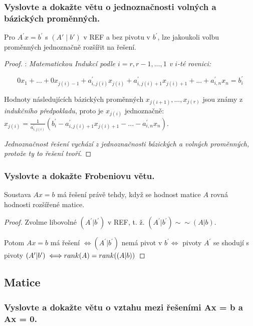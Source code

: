 \documentclass[10pt,a4paper]{article}
\begin{document}
\subsubsection{Vyslovte a dokažte větu o jednoznačnosti volných a bázických proměnných.}

Pro $A^\prime x = b^\prime$ s $(A'\mid b')$ v REF a bez pivotu v $b^\prime$, lze jakoukoli volbu proměnných jednoznačně rozšířit na řešení.


\begin{proof}:
\textit{Matematickou Indukcí podle $i = {r, r-1, ..., 1}$ v $i$-té rovnici:}

\begin{equation*}
0x_1 + ... + 0x_{j(i)-1} + a_{i, j(i)}^\prime x_{j(i)} + a_{i, j(i)+1}^\prime x_{j(i)+1} + ... + a_{i, n}^\prime x_n = b_i^\prime
\end{equation*}

Hodnoty následujících bázických proměnných $x_{j(i+1)}, ..., x_{j(r)}$ jsou známy z \textit{indukčního předpokladu}, proto je $x_{j(i)}$ jednoznačně: $x_{j(i)} = \frac{1}{a_{i, j(i)}^\prime}(b_i^\prime - a_{i, j(i)+1}^\prime x_{j(i) + 1} - ... - a_{i, n}^\prime x_n)$.

\textit{Jednoznačnost řešení vychází z jednoznačnosti bázických a volných proměnných, protože ty to řešení tvoří.}

\end{proof}


\subsubsection{Vyslovte a dokažte Frobeniovu větu.}

Soustava $Ax = b$ má řešení právě tehdy, když se hodnost matice $A$ rovná hodnosti rozšířené matice.

\begin{proof}
Zvolme libovolné $(A^\prime|b^\prime)$  v REF, t. ž. $(A^\prime|b^\prime) \sim \sim (A | b)$.

Potom $Ax = b$ má řešení $\iff (A^\prime|b^\prime)$ nemá pivot v $b^\prime \iff$ pivoty $A^\prime$ se shodují s pivoty $(A^\prime|b^\prime) \iff \\rank(A) = rank((A|b))$ 
\end{proof}

\newpage
\subsection{Matice}
\subsubsection{Vyslovte a dokažte větu o vztahu mezi řešeními Ax = b a Ax = 0.}
\end{document}
